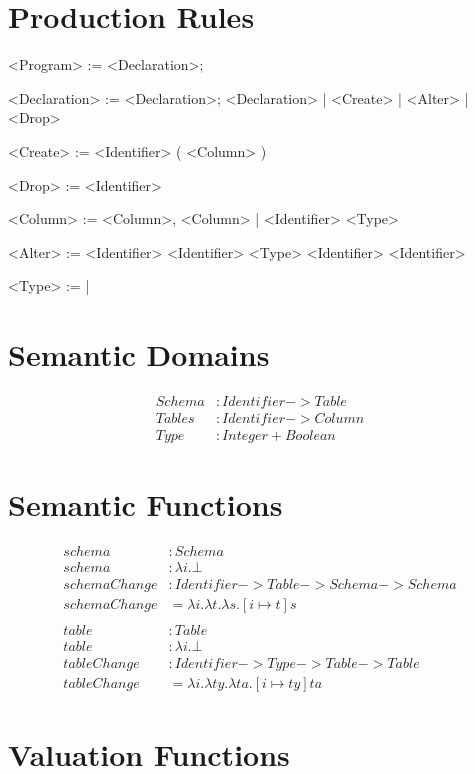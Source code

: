 \documentclass[12pt]{article}
\begin{document}
\section{Production Rules}
\begin{grammar}
  <Program> := <Declaration>;

  <Declaration> := <Declaration>; <Declaration> | <Create> | <Alter> | <Drop>

  <Create> :=  <Identifier> ( <Column> )

  <Drop> :=  <Identifier>

  <Column> := <Column>, <Column> | <Identifier> <Type>

  <Alter> :=  <Identifier>  <Identifier> <Type>
           \alt {} <Identifier>  <Identifier>

  <Type> :=  | 
\end{grammar}

\section{Semantic Domains}
\begin{align*}
  Schema &: Identifier -> Table \\
  Tables &: Identifier -> Column \\
  Type &: Integer + Boolean
\end{align*}

\section{Semantic Functions}
\begin{align*}
  schema &: Schema \\
  schema &: \lambda i.\bot \\
  schemaChange &: Identifier -> Table -> Schema -> Schema \\
  schemaChange &= \lambda i. \lambda t. \lambda s. [ i \mapsto t ]s \\
  \\
  table &: Table \\
  table &: \lambda i.\bot \\
  tableChange &: Identifier -> Type -> Table -> Table \\
  tableChange &= \lambda i. \lambda ty. \lambda ta. [ i \mapsto ty ]ta
\end{align*}

\section{Valuation Functions}
\end{document}
